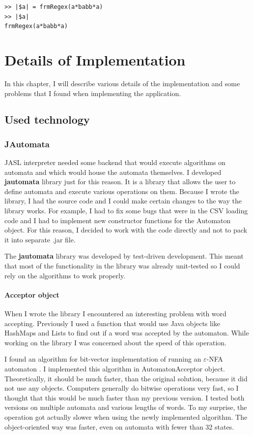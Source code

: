 \documentclass{ctuthesis}
\begin{document}
\begin{minipage}{\linewidth}
\begin{lstlisting}[language = JASL_snippet]
>> |$a| = frmRegex(a*babb*a)
>> |$a|
frmRegex(a*babb*a)
\end{lstlisting}
\end{minipage}

\chapter{Details of Implementation}
In this chapter, I will describe various details of the implementation and some problems that I found when implementing the application.

\section{Used technology}
\subsection{JAutomata}
JASL interpreter needed some backend that would execute algorithms on automata and which would house the automata themselves. I developed \textbf{jautomata} library just for this reason. It is a library that allows the user to define automata and execute various operations on them. Because I wrote the library, I had the source code and I could make certain changes to the way the library works. For example, I had to fix some bugs that were in the CSV loading code and I had to implement new constructor functions for the Automaton object. For this reason, I decided to work with the code directly and not to pack it into separate .jar file. 

The \textbf{jautomata} library was developed by test-driven development. This meant that most of the functionality in the library was already unit-tested so I could rely on the algorithms to work properly. 

\subsubsection{Acceptor object}
When I wrote the library I encountered an interesting problem with word accepting. Previously I used a function that would use Java objects like HashMaps and Lists to find out if a word was accepted by the automaton. While working on the library I was concerned about the speed of this operation. 

I found an algorithm for bit-vector implementation of running an $\varepsilon$-NFA automaton \cite{acceptor-algorithm}. I implemented this algorithm in AutomatonAcceptor object. Theoretically, it should be much faster, than the original solution, because it did not use any objects. Computers generally do bitwise operations very fast, so I thought that this would be much faster than my previous version. I tested both versions on multiple automata and various lengths of words. To my surprise, the operation got actually slower when using the newly implemented algorithm. The object-oriented way was faster, even on automata with fewer than 32 states. 
\end{document}
